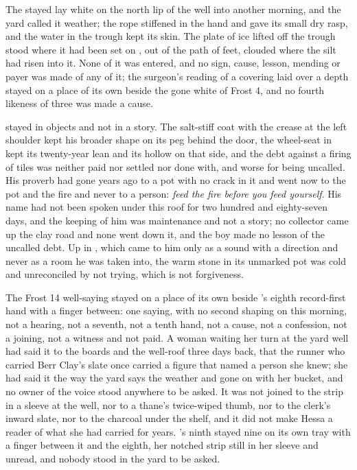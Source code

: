 The stayed  lay white on the north lip of the well into another morning, and the yard called it weather; the rope stiffened in the hand and gave its small dry rasp, and the water in the trough kept its skin. The plate of ice lifted off the trough stood where it had been set on , out of the path of feet, clouded where the silt had risen into it. None of it was entered, and no sign, cause, lesson, mending or payer was made of any of it; the surgeon's reading of a covering laid over a depth stayed on a place of its own beside the gone white of Frost 4, and no fourth likeness of three was made a cause.

 stayed in objects and not in a story. The salt-stiff coat with the crease at the left shoulder kept his broader shape on its peg behind the door, the wheel-seat in  kept its twenty-year lean and its hollow on that side, and the debt against a firing of tiles was neither paid nor settled nor done with, and worse for being uncalled. His proverb had gone years ago to a pot with no crack in it and went now to the pot and the fire and never to a person: \emph{feed the fire before you feed yourself}. His name had not been spoken under this roof for two hundred and eighty-seven days, and the keeping of him was maintenance and not a story; no collector came up the clay road and none went down it, and the boy made no lesson of the uncalled debt. Up in , which came to him only as a sound with a direction and never as a room he was taken into, the warm stone in its unmarked pot was cold and unreconciled by not trying, which is not forgiveness.

\scenebreak

The Frost 14 well-saying stayed on a place of its own beside 's eighth record-first hand with a finger between: one saying, with no second shaping on this morning, not a hearing, not a seventh, not a tenth hand, not a cause, not a confession, not a joining, not a witness and not paid. A woman waiting her turn at the yard well had said it to the boards and the well-roof three days back, that the runner who carried Berr Clay's slate once carried a figure that named a person she knew; she had said it the way the yard says the weather and gone on with her bucket, and no owner of the voice stood anywhere to be asked. It was not joined to the strip in a sleeve at the well, nor to a thane's twice-wiped thumb, nor to the clerk's inward slate, nor to the charcoal under the shelf, and it did not make Hessa a reader of what she had carried for years. 's ninth stayed nine on its own tray with a finger between it and the eighth, her notched strip still in her sleeve and unread, and nobody stood in the yard to be asked.

